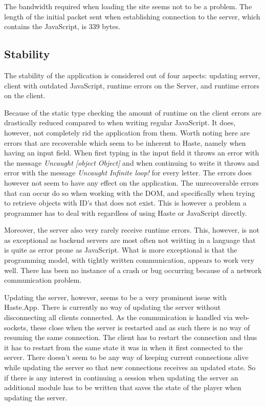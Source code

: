 \documentclass[a4paper]{article}
\begin{document}
The bandwidth required when loading the site seems not to be a problem. The length of the initial packet sent when establishing connection to the server, which contains the JavaScript, is 339 bytes. 



\subsection{Stability}
The stability of the application is considered out of four aspects: updating server, client with outdated JavaScript, runtime errors on the Server, and runtime errors on the client.

Because of the static type checking the amount of runtime on the client errors are drastically reduced compared to when writing regular JavaScript. It does, however, not completely rid the application from them. Worth noting here are errors that are recoverable which seem to be inherent to Haste, namely when having an input field. When first typing in the input field it throws an error with the message \textit{Uncaught [object Object]} and when continuing to write it throws and error with the message \textit{Uncaught Infinite loop!} for every letter. The errors does however not seem to have any effect on the application. The unrecoverable errors that can occur do so when working with the DOM, and specifically when trying to retrieve objects with ID's that does not exist. This is however a problem a programmer has to deal with regardless of using Haste or JavaScript directly.

Moreover, the server also very rarely receive runtime errors. This, however, is not as exceptional as backend servers are most often not writting in a language that is quite as error prone as JavaScript. What is more exceptional is that the programming model, with tightly written communication, appears to work very well. There has been no instance of a crash or bug occurring because of a network communication problem.

Updating the server, however, seems to be a very prominent issue with Haste.App. There is currently no way of updating the server without disconnecting all clients connected. As the communication is handled via web-sockets, these close when the server is restarted and as such there is no way of resuming the same connection. The client has to restart the connection and thus it has to restart from the same state it was in when it first connected to the server. There doesn't seem to be any way of keeping current connections alive while updating the server so that new connections receives an updated state. So if there is any interest in continuing a session when updating the server an additional module has to be written that saves the state of the player when updating the server.
\end{document}
